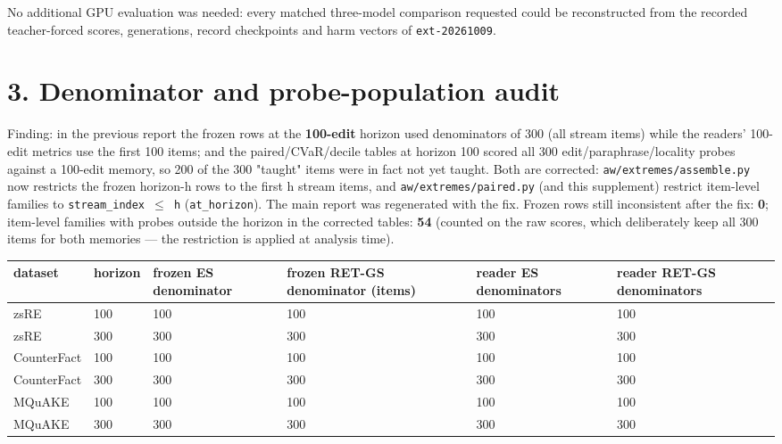 \documentclass[10pt,a4paper]{article}
\begin{document}
No additional GPU evaluation was needed: every matched three-model comparison requested could be reconstructed from the recorded teacher-forced scores, generations, record checkpoints and harm vectors of \texttt{ext-20261009}.



\section*{3. Denominator and probe-population audit}



Finding: in the previous report the frozen rows at the \textbf{100-edit} horizon used denominators of 300 (all stream items) while the readers' 100-edit metrics use the first 100 items; and the paired/CVaR/decile tables at horizon 100 scored all 300 edit/paraphrase/locality probes against a 100-edit memory, so 200 of the 300 "taught" items were in fact not yet taught. Both are corrected: \texttt{aw/extremes/assemble.py} now restricts the frozen horizon-h rows to the first h stream items, and \texttt{aw/extremes/paired.py} (and this supplement) restrict item-level families to \texttt{stream\_index $\le$ h} (\texttt{at\_horizon}). The main report was regenerated with the fix. Frozen rows still inconsistent after the fix: \textbf{0}; item-level families with probes outside the horizon in the corrected tables: \textbf{54} (counted on the raw scores, which deliberately keep all 300 items for both memories — the restriction is applied at analysis time).



\begin{center}\footnotesize
\begin{tabularx}{\textwidth}{@{}p{}XXXXX@{}}
\toprule
dataset & horizon & frozen ES denominator & frozen RET-GS denominator (items) & reader ES denominators & reader RET-GS denominators \\ \midrule
zsRE & 100 & 100 & 100 & 100 & 100 \\
zsRE & 300 & 300 & 300 & 300 & 300 \\
CounterFact & 100 & 100 & 100 & 100 & 100 \\
CounterFact & 300 & 300 & 300 & 300 & 300 \\
MQuAKE & 100 & 100 & 100 & 100 & 100 \\
MQuAKE & 300 & 300 & 300 & 300 & 300 \\
\bottomrule
\end{tabularx}
\end{center}
\end{document}
